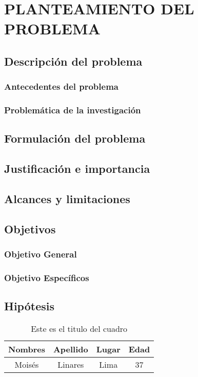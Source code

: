 \chapter{PLANTEAMIENTO DEL PROBLEMA}
  \section{Descripción del problema}
    \subsection{Antecedentes del problema}
    \subsection{Problemática de la investigación}
  \section{Formulación del problema}
  \section{Justificación e importancia}
  \section{Alcances y limitaciones}
  \section{Objetivos}
    \subsection{Objetivo General}
    \subsection{Objetivo Específicos}
  \section{Hipótesis}
    \lipsum[2]
    \begin{table}[h]
        \centering
        \begin{tabular}{|c|c|c|c|}
        \hline
        Nombres & Apellido & Lugar & Edad \\
        \hline
             Moisés & Linares & Lima & 37 \\
        \hline
        \end{tabular}
        \caption{Este es el titulo del cuadro}
        \label{tab:Primara Tabla}
    \end{table}